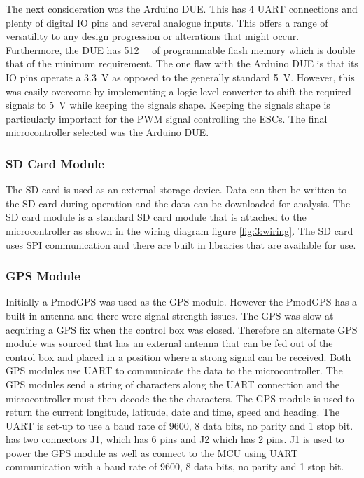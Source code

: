 		The next consideration was the Arduino DUE. This has 4 UART connections and plenty of digital IO pins and several analogue inputs. This offers a range of versatility to any design progression or alterations that might occur. Furthermore, the DUE has \SI{512}{\kilo\byte} of programmable flash memory which is double that of the minimum requirement. The one flaw with the Arduino DUE is that its IO pins operate a \SI{3.3}{\volt} as opposed to the generally standard \SI{5}{\volt}. However, this was easily overcome by implementing a logic level converter to shift the required signals to \SI{5}{\volt} while keeping the signals shape. Keeping the signals shape is particularly important for the PWM signal controlling the ESCs. The final microcontroller selected was the Arduino DUE.
		\subsubsection{SD Card Module}
		The SD card is used as an external storage device. Data can then be written to the SD card during operation and the data can be downloaded for analysis. The SD card module is a standard SD card module that is attached to the microcontroller as shown in the wiring diagram figure \ref{fig:3:wiring}. The SD card uses SPI communication and there are built in libraries that are available for use.
		\subsubsection{GPS Module}
		Initially a PmodGPS was used as the GPS module. However the PmodGPS has a built in antenna and there were signal strength issues. The GPS was slow at acquiring a GPS fix when the control box was closed. Therefore an alternate GPS module was sourced that has an external antenna that can be fed out of the control box and placed in a position where a strong signal can be received. Both GPS modules use UART to communicate the data to the microcontroller. The GPS modules send a string of characters along the UART connection and the microcontroller must then decode the the characters. The GPS module is used to return the current longitude, latitude, date and time, speed and heading. The UART is set-up to use a baud rate of 9600, 8 data bits, no parity and 1 stop bit.   
		has two connectors J1, which has 6 pins and J2 which has 2 pins. J1 is used to power the GPS module as well as connect to the MCU using UART communication with a baud rate of 9600, 8 data bits, no parity and 1 stop bit. 	
